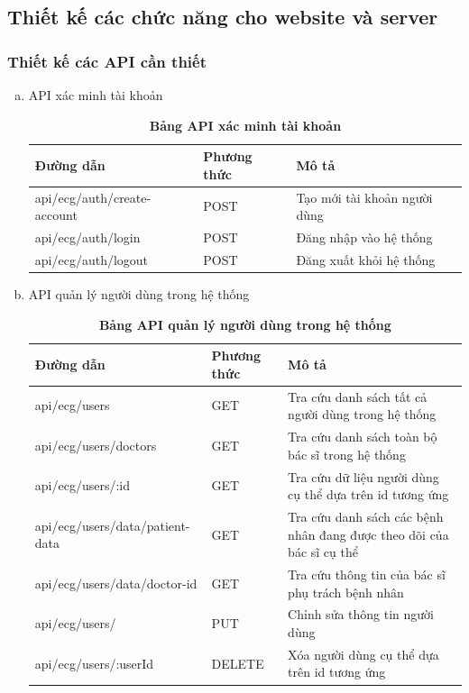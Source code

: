 \subsection{Thiết kế các chức năng cho website và server}

\subsubsection{Thiết kế các API cần thiết}


\begin{enumerate}[a)]
	\item API xác minh tài khoản

	\begin{xltabular}{\textwidth}{
	  | >{\raggedright\arraybackslash}m{4.6cm}
	  | >{\centering\arraybackslash}m{2.8cm}
	  | >{\raggedright\arraybackslash}X |
	  }
	  \caption{\bfseries \fontsize{12pt}{0pt}\selectfont Bảng API xác minh tài khoản}
	  \label{table_api_auth}
	  \\
	  \hline
	  \bfseries Đường dẫn    &\bfseries Phương thức    &\bfseries Mô tả\\ \hline
	  api/ecg/auth/create-account   &   POST  & Tạo mới tài khoản người dùng \\ \hline
	  api/ecg/auth/login   &    POST    & Đăng nhập vào hệ thống \\ \hline
	  api/ecg/auth/logout   &    POST    & Đăng xuất khỏi hệ thống \\ \hline
	\end{xltabular}
  
	\item API quản lý người dùng trong hệ thống
	\begin{xltabular}{\textwidth}{
	  | >{\raggedright\arraybackslash}m{4.6cm}
	  | >{\centering\arraybackslash}m{2.8cm}
	  | >{\raggedright\arraybackslash}X |
	  }
	  \caption{\bfseries \fontsize{12pt}{0pt}\selectfont Bảng API quản lý người dùng trong hệ thống}
	  \label{table_api_user}
	  \\
	  \hline
	  \bfseries Đường dẫn    &\bfseries Phương thức    &\bfseries Mô tả\\ \hline
	  api/ecg/users   &   GET  &  Tra cứu danh sách tất cả người dùng trong hệ thống\\  \hline
	  api/ecg/users/doctors   &   GET  &  Tra cứu danh sách toàn bộ bác sĩ trong hệ thống \\  \hline
	  api/ecg/users/:id   &   GET  &  Tra cứu dữ liệu người dùng cụ thể dựa trên id tương ứng \\  \hline
	  api/ecg/users/data/patient-data   &   GET  &  Tra cứu danh sách các bệnh nhân đang được theo dõi của bác sĩ cụ thể \\  \hline
	  api/ecg/users/data/doctor-id   &   GET  &  Tra cứu thông tin của bác sĩ phụ trách bệnh nhân \\  \hline
	  api/ecg/users/   &   PUT  &  Chỉnh sửa thông tin người dùng \\  \hline
	  api/ecg/users/:userId  &   DELETE  &  Xóa người dùng cụ thể dựa trên id tương ứng \\  \hline
	\end{xltabular}
  

\end{enumerate}
